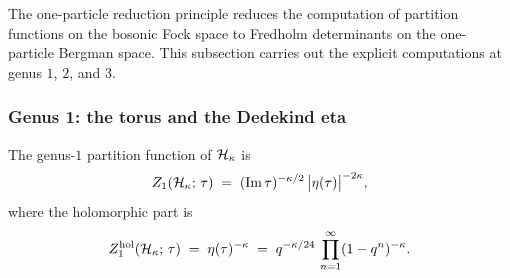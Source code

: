 The one-particle reduction principle reduces the computation
of partition functions on the bosonic Fock space to Fredholm
determinants on the one-particle Bergman space. This subsection
carries out the explicit computations at genus $1$, $2$, and $3$.

\subsubsection{Genus 1: the torus and the Dedekind eta}

\begin{theorem}%
\label{thm:thqg-X-genus-1-fredholm}%
%
%
The genus-$1$ partition function of $\mathcal{H}_\kappa$ is
\begin{equation}\label{eq:thqg-X-genus-1-det}
Z_1(\mathcal{H}_\kappa;\,\tau)
\;=\;
(\operatorname{Im}\tau)^{-\kappa/2}\,
\bigl|\eta(\tau)\bigr|^{-2\kappa},
\end{equation}
where the holomorphic part is
\begin{equation}\label{eq:thqg-X-genus-1-hol}
Z_1^{\mathrm{hol}}(\mathcal{H}_\kappa;\,\tau)
\;=\;
\eta(\tau)^{-\kappa}
\;=\;
q^{-\kappa/24}\,
\prod_{n=1}^{\infty}
(1 - q^n)^{-\kappa}.
\end{equation}
\end{theorem}

